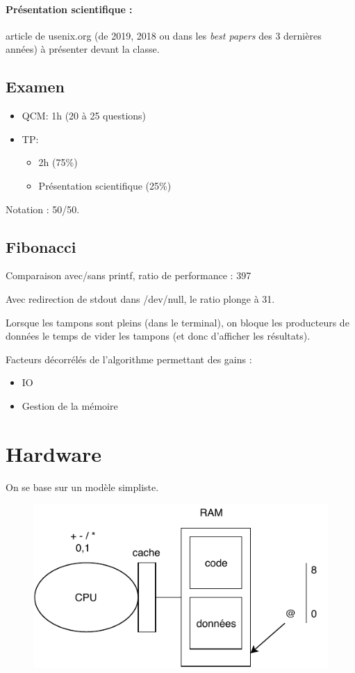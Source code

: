 \documentclass[11pt]{article}
\begin{document}
\paragraph{Présentation scientifique :} article de usenix.org (de 2019, 2018 ou dans les \textit{best papers} des 3 dernières années) à présenter devant la classe.

\subsection{Examen}
\begin{itemize}
    \item QCM: 1h (20 à 25 questions) \\
    \item TP: 
    \begin{itemize}
        \item 2h (75\%)
        \item Présentation scientifique (25\%)
    \end{itemize}
\end{itemize}


Notation : 50/50.

\subsection{Fibonacci}
Comparaison avec/sans printf, ratio de performance : 397

Avec redirection de stdout dans /dev/null, le ratio plonge à 31.

Lorsque les tampons sont pleins (dans le terminal), on bloque les producteurs de données le temps de vider les tampons (et donc d'afficher les résultats).

Facteurs décorrélés de l'algorithme permettant des gains :
\begin{itemize}
    \item IO
    \item Gestion de la mémoire
\end{itemize}

\section{Hardware}
On se base sur un modèle simpliste.
\begin{figure}
    \centering
    \includegraphics{img/cpu+ram.pdf}
\end{figure}
\end{document}
